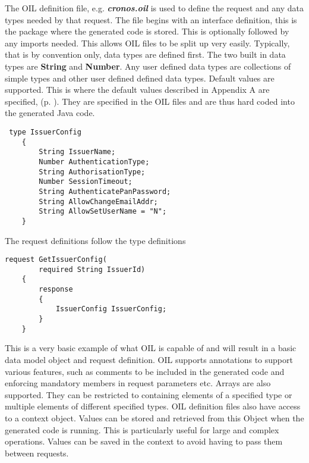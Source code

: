 \documentclass[a4paper, 11pt, titlepage]{article}
\begin{document}
 
The OIL definition file, e.g. \textbf{\textit{cronos.oil}} is used to define the request and any data types needed by that request. The file begins with an interface definition, this is the package where the generated code is stored. This is optionally followed by any imports needed. This allows OIL files to be split up very easily. Typically, that is by convention only, data types are defined first. The two built in data types are \textbf{String} and \textbf{Number}. Any user defined data types are collections of simple types and other user defined defined data types. Default values are supported. This is where the default values described in Appendix A are specified, (p. \pageref{default_retail_values}). They are specified in the OIL files and are thus hard coded into the generated Java code. 
\begin{verbatim} 
 type IssuerConfig 
    { 
        String IssuerName; 
        Number AuthenticationType; 
        String AuthorisationType; 
        Number SessionTimeout; 
        String AuthenticatePanPassword; 
        String AllowChangeEmailAddr; 
        String AllowSetUserName = "N"; 
    } 
\end{verbatim} 
The request definitions follow the type definitions 
\begin{verbatim} 
request GetIssuerConfig( 
        required String IssuerId) 
    { 
        response 
        { 
            IssuerConfig IssuerConfig; 
        } 
    } 
\end{verbatim} 
This is a very basic example of what OIL is capable of and will result in a basic data model object and request definition. OIL supports annotations to support various features, such as comments to be included in the generated code and enforcing mandatory members in request parameters etc. Arrays are also supported. They can be restricted to containing elements of a specified type or multiple elements of different specified types. OIL definition files also have access to a context object. Values can be stored and retrieved from this Object when the generated code is running. This is particularly useful for large and complex operations. Values can be saved in the context to avoid having to pass them between requests. 
 
\end{document}
